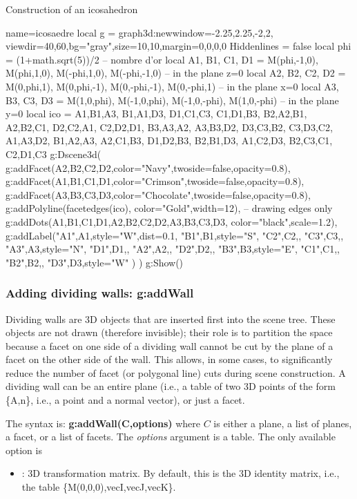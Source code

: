 \begin{demo}{Construction of an icosahedron}
\begin{luadraw}{name=icosaedre}
local g = graph3d:new{window={-2.25,2.25,-2,2}, viewdir={40,60},bg="gray",size={10,10},margin={0,0,0,0}}
Hiddenlines = false
local phi = (1+math.sqrt(5))/2 -- nombre d'or
local A1, B1, C1, D1 = M(phi,-1,0), M(phi,1,0), M(-phi,1,0), M(-phi,-1,0) -- in the plane z=0
local A2, B2, C2, D2 = M(0,phi,1), M(0,phi,-1), M(0,-phi,-1), M(0,-phi,1) -- in the plane x=0
local A3, B3, C3, D3 = M(1,0,phi), M(-1,0,phi), M(-1,0,-phi), M(1,0,-phi) -- in the plane y=0
local ico = {   {A1,B1,A3}, {B1,A1,D3}, {D1,C1,C3}, {C1,D1,B3},
                {B2,A2,B1}, {A2,B2,C1}, {D2,C2,A1}, {C2,D2,D1},
                {B3,A3,A2}, {A3,B3,D2}, {D3,C3,B2}, {C3,D3,C2},
                {A1,A3,D2}, {B1,A2,A3}, {A2,C1,B3}, {D1,D2,B3},
                {B2,B1,D3}, {A1,C2,D3}, {B2,C3,C1}, {C2,D1,C3}  }
g:Dscene3d(
    g:addFacet({A2,B2,C2,D2},{color="Navy",twoside=false,opacity=0.8}),
    g:addFacet({A1,B1,C1,D1},{color="Crimson",twoside=false,opacity=0.8}),
    g:addFacet({A3,B3,C3,D3},{color="Chocolate",twoside=false,opacity=0.8}),
    g:addPolyline(facetedges(ico), {color="Gold",width=12}), -- drawing edges only
    g:addDots({A1,B1,C1,D1,A2,B2,C2,D2,A3,B3,C3,D3}, {color="black",scale=1.2}),
    g:addLabel("A1",A1,{style="W",dist=0.1}, "B1",B1,{style="S"}, "C2",C2,{}, "C3",C3,{}, "A3",A3,{style="N"}, "D1",D1,{},  "A2",A2,{},  "D2",D2,{}, "B3",B3,{style="E"}, "C1",C1,{}, "B2",B2,{}, "D3",D3,{style="W"} )
)
g:Show()
\end{luadraw}
\end{demo}

\subsubsection{Adding dividing walls: g:addWall}

Dividing walls are 3D objects that are inserted first into the scene tree. These objects are not drawn (therefore invisible); their role is to partition the space because a facet on one side of a dividing wall cannot be cut by the plane of a facet on the other side of the wall. This allows, in some cases, to significantly reduce the number of facet (or polygonal line) cuts during scene construction. A dividing wall can be an entire plane (i.e., a table of two 3D points of the form \{A,n\}, i.e., a point and a normal vector), or just a facet.

The syntax is: \textbf{g:addWall(C,options)} where $C$ is either a plane, a list of planes, a facet, or a list of facets. The \emph{options} argument is a table. The only available option is
\begin{itemize}
    \item {}: 3D transformation matrix. By default, this is the 3D identity matrix, i.e., the table \{M(0,0,0),vecI,vecJ,vecK\}.
\end{itemize}

